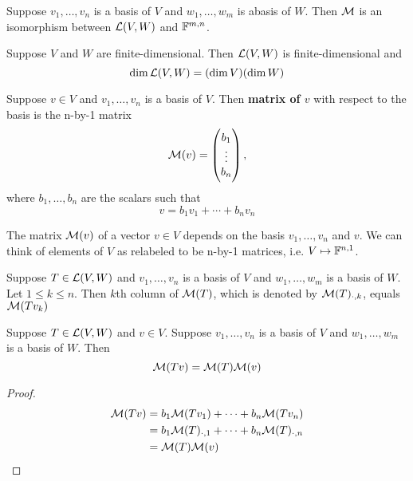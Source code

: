 \documentclass{extarticle}
\begin{document}
\begin{thm}
    Suppose \(v_1, \ldots, v_n\) is a basis of \(V\) and \(w_1, \ldots, w_m\) is abasis of \(W\). 
    Then \(\mathcal{M}\) is an isomorphism between \(\mathcal{L}(V, W)\) and \(\mathbb{F}^{m, n}\). 
\end{thm}


\begin{corollary}
    Suppose \(V\) and \(W\) are finite-dimensional. Then \(\mathcal{L}(V, W)\) is finite-dimensional and 
    \[\dim \mathcal{L}(V, W) = (\dim V) (\dim W)\]
\end{corollary}

\begin{definition}
    Suppose \(v \in V\) and \(v_1, \ldots, v_n\) is a basis of \(V\). Then \textbf{matrix of \(v\)} 
    with respect to the basis is the n-by-1 matrix 
    \[\mathcal{M}(v) = \begin{pmatrix}
        b_1 \\ 
        \vdots \\ 
        b_n
    \end{pmatrix},\]
    where \(b_1, \ldots, b_n\) are the scalars such that 
    \[v = b_1 v_1 + \cdots + b_n v_n\] 
\end{definition}


\begin{remark}
    The matrix \(\mathcal{M}(v)\) of a vector \(v \in V\) depends on the basis \(v_1, \ldots, v_n\) and \(v\). We 
    can think of elements of \(V\) as relabeled to be n-by-1 matrices, i.e. \(V \mapsto \mathbb{F}^{n , 1}\).
\end{remark}

\begin{corollary}
    Suppose \(T \in \mathcal{L}(V, W)\) and \(v_1, \ldots, v_n\) is a basis of \(V\) and \(w_1, \ldots, w_m\)
    is a basis of \(W\). Let \(1 \leq k \leq n\). Then \(k\)th column of \(\mathcal{M}(T)\), which is denoted 
    by \(\mathcal{M}(T)_{\cdot, k}\), equals \(\mathcal{M}(T v_k)\)
\end{corollary}


\begin{thm}
    Suppose \(T \in \mathcal{L}(V, W)\) and \(v \in V\). Suppose \(v_1, \ldots, v_n\) is a basis of \(V\)
    and \(w_1, \ldots, w_m\) is a basis of \(W\). Then 
    \[\mathcal{M}(Tv) = \mathcal{M}(T) \mathcal{M}(v)\]
\end{thm}

\begin{proof}
\begin{align*}
    \mathcal{M}(Tv)
    &= b_1 \mathcal{M}(T v_1) + \cdots + b_n \mathcal{M}(T v_n) \\ 
    &= b_1 \mathcal{M}(T)_{\cdot, 1} + \cdots + b_n \mathcal{M}(T)_{\cdot, n} \\ 
    &= \mathcal{M}(T) \mathcal{M}(v)
\end{align*}
\end{proof}
\end{document}
